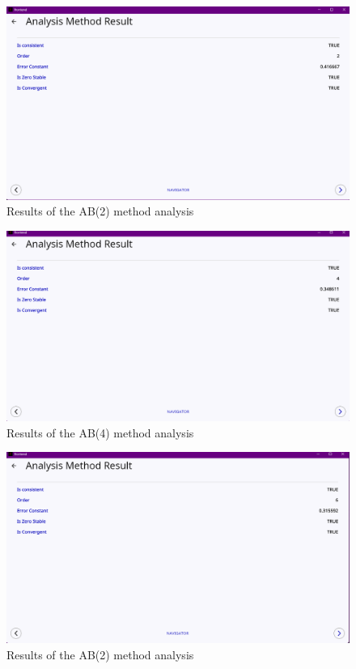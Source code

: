 \documentclass[a4paper, twoside]{report} %
\begin{document}
	\begin{figure}[htbp]
		\centering
		\includegraphics[width=1\textwidth]{chapters/4/image/ab(2)b.png}
		\caption{Results of the AB(2) method analysis}
	\end{figure}

	\begin{figure}[htbp]
		\centering
		\includegraphics[width=1\textwidth]{chapters/4/image/ab(4)b.png}
		\caption{Results of the AB(4) method analysis}
	\end{figure}

	\begin{figure}[htbp]
		\centering
		\includegraphics[width=1\textwidth]{chapters/4/image/ab(6).png}
		\caption{Results of the AB(2) method analysis}
	\end{figure}
\end{document}
